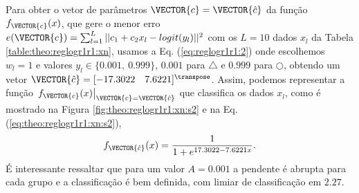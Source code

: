 \begin{SolutionT}\label{sol:theo:reglogr1r1:s2}
Para obter o vetor de parâmetros $\VECTOR{c}=\VECTOR{\hat{c}}$ da função $f_{\VECTOR{c}}(x)$, 
que gere o menor erro $e(\VECTOR{c}) =  \sum_{l=1}^{L} ||c_1 +c_2 x_l-logit(y_l)||^2$
com os $L=10$ dados $x_l$ da Tabela \ref{table:theo:reglogr1r1:xn},
usamos a Eq. (\ref{eq:reglogr1r1:2}) onde escolhemos $w_l=1$ e valores $y_l \in \{0.001,~ 0.999\}$,
$0.001$ para $\bigtriangleup$ e $0.999$ para $\bigcirc$,
obtendo um vetor $\VECTOR{\hat{c}}=[-17.3022\quad 7.6221]^{\transpose}$. 
Assim, podemos representar a função $\left.f_{\VECTOR{c}}(x)\right|_{\VECTOR{c}=\VECTOR{\hat{c}}}$ que classifica os dados $x_l$, 
como é mostrado na Figura \ref{fig:theo:reglogr1r1:xn:s2}  e na Eq. (\ref{eq:theo:reglogr1r1:xn:s2}),
\begin{equation}\label{eq:theo:reglogr1r1:xn:s2}
f_{\VECTOR{\hat{c}}}(x)= \frac{1}{1+e^{ 17.3022-7.6221 x}}.
\end{equation}
É interessante ressaltar que para um valor $A=0.001$ a pendente é abrupta para cada grupo e a classificação é bem definida,
com limiar de classificação em $2.27$.
\end{SolutionT}
